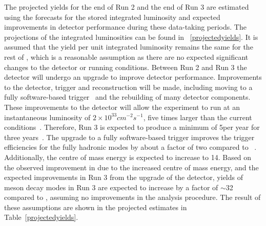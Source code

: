 The projected yields for the end of Run 2 and the end of Run 3 are estimated using the forecasts for the stored integrated luminosity and expected improvements in detector performance during these data-taking periods. The projections of the integrated luminosities can be found in \tab~\ref{projectedyields}. It is assumed that the yield per unit integrated luminosity remains the same for the rest of \runtwo, which is a reasonable assumption as there are no expected significant changes to the detector or running conditions. Between Run 2 and Run 3 the detector will undergo an upgrade to improve detector performance. Improvements to the detector, trigger and reconstruction will be made, including moving to a fully software-based trigger~\cite{CERN-LHCC-2014-016} and the rebuilding of many detector components. These improvements to the detector will allow the experiment to run at an instantaneous luminosity of $2 \times 10^{33} cm^{-2}s^{-1}$, five times larger than the current conditions~\cite{CERN-LHCC-2014-016}. Therefore, Run 3 is expected to produce a minimum of 5\invfb per year for three years~\cite{CERN-LHCC-2014-016}. The upgrade to a fully software-based trigger improves the trigger efficiencies for the fully hadronic modes by about a factor of two compared to \runone~\cite{CERN-LHCC-2014-016}. Additionally, the centre of mass energy is expected to increase to 14\tev. Based on the observed improvement in \runtwo due to the increased centre of mass energy, and the expected improvements in Run 3 from the upgrade of the detector, yields of \B meson decay modes in Run 3 are expected to increase by a factor of $\sim$32 compared to \runone, assuming no improvements in the analysis procedure. The result of these assumptions are shown in the projected estimates in Table~\ref{projectedyields}.

\begin{table}
\caption{Yields and projected yields for different data-taking periods of the LHC. The entries in bold are projected yields, whereas the other entries refer to data used in this thesis. Projected results are justified in the text, with information taken from Ref.~\cite{CERN-LHCC-2014-016}.}
\label{projectedyields}
\end{table}


